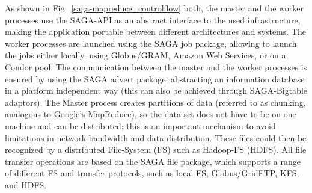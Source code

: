 \documentclass[conference,final]{IEEEtran}
\begin{document}



As shown in Fig.~\ref{saga-mapreduce_controlflow} both, the master and
the worker processes use the SAGA-API as an abstract interface to the
used infrastructure, making the application portable between different
architectures and systems. The worker processes are launched using the
SAGA job package, allowing to launch the jobs either locally, using
Globus/GRAM, Amazon Web Services, or on a Condor pool. The
communication between the master and the worker processes is ensured
by using the SAGA advert package, abstracting an information database
in a platform independent way (this can also be achieved through
SAGA-Bigtable adaptors).  The Master process creates partitions of
data (referred to as chunking, analogous to Google's MapReduce), so
the data-set does not have to be on one machine and can be
distributed; this is an important mechanism to avoid limitations in
network bandwidth and data distribution.  These files could then be
recognized by a distributed File-System (FS) such as Hadoop-FS
(HDFS). All file transfer operations are based on the SAGA file
package, which supports a range of different FS and transfer
protocols, such as local-FS, Globus/GridFTP, KFS, and HDFS.

\end{document}
